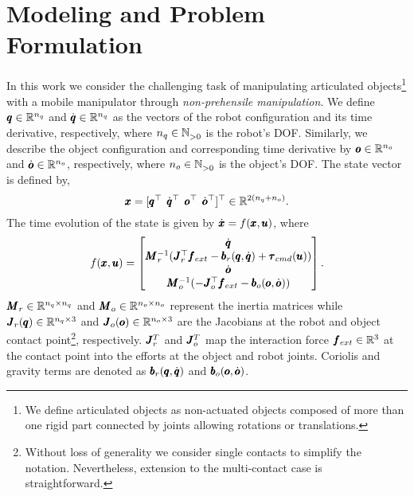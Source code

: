 \section{Modeling and Problem Formulation} \label{sec:formulation}

In this work we consider the challenging task of manipulating articulated objects\footnote{We define articulated objects as non-actuated objects composed of more than one rigid part connected by joints allowing rotations or translations.} with a mobile manipulator through \textit{non-prehensile manipulation}. We define $\pmb{q} \in \mathbb{R}^{n_q}$ and $\dot{\pmb{q}} \in \mathbb{R}^{n_q}$ as the vectors of the robot configuration and its time derivative, respectively, where $n_q \in \mathbb{N}^{}_{>0}$ is the robot's DOF.
Similarly, we describe the object configuration and corresponding time derivative by $\pmb{o} \in \mathbb{R}^{n_o}$ and $\dot{\pmb{o}} \in \mathbb{R}^{n_o}$, respectively, where $n_o \in \mathbb{N}^{}_{>0}$ is the object's DOF. The state vector is defined by,
\begin{equation}
    \pmb{x} = [\pmb{q}^\top \;\, 
      \dot{\pmb{q}}^\top \;\, 
      \pmb{o}^\top \;\,
      \dot{\pmb{o}}^\top ]^\top  \in \mathbb{R}^{2(n_q + n_o)}.
\end{equation}
The time evolution of the state is given by $\dot{\pmb{x}} = f(\pmb{x}, \pmb{u})$, where
\begin{equation} \label{eq:eom}
    f(\pmb{x}, \pmb{u}) =  
    \begin{bmatrix}
      \dot{\pmb{q}} \\
      \pmb{M}_r^{-1}(\pmb{J}_{r}^\top \pmb{f}_{ext} - \pmb{b}_{r}(\pmb{q}, \dot{\pmb{q}}) + \pmb{\tau}_{cmd}(\pmb{u})) \\
      \dot{\pmb{o}} \\
      \pmb{M}_o^{-1}(-\pmb{J}_{o}^\top \pmb{f}_{ext} - \pmb{b}_{o}(\pmb{o}, \dot{\pmb{o}}))
    \end{bmatrix}.
\end{equation}
$\pmb{M}_r \in \mathbb{R}^{n_q \times n_q}$ and $\pmb{M}_o \in \mathbb{R}^{n_o \times n_o}$ represent the inertia matrices while $\pmb{J}_r(\pmb{q}) \in \mathbb{R}^{n_q \times 3}$ and $\pmb{J}_o(\pmb{o}) \in \mathbb{R}^{n_o \times 3}$ are the Jacobians at the robot and object contact point\footnote{Without loss of generality we consider single contacts to simplify the notation. Nevertheless, extension to the multi-contact case is straightforward.}, respectively.
$\pmb{J}^T_r$ and $\pmb{J}^T_o$ map the interaction force $\pmb{f}_{ext} \in \mathbb{R}^{3}$ at the contact point into the efforts at the object and robot joints. Coriolis and gravity terms are denoted as $\pmb{b}_{r}(\pmb{q}, \dot{\pmb{q}})$ and $\pmb{b}_{o}(\pmb{o}, \dot{\pmb{o}})$. 

